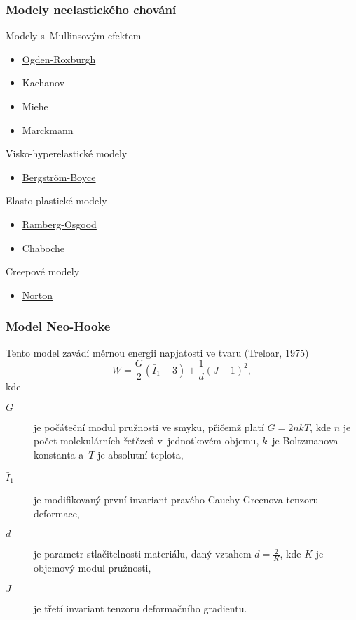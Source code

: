 \subsubsection{Modely neelastického chování}
Modely s~Mullinsovým efektem
\begin{itemize}
	\item \hyperref[sec:ogden-roxburgh]{Ogden-Roxburgh}
	\item Kachanov
	\item Miehe
	\item Marckmann
\end{itemize}

Visko-hyperelastické modely
\begin{itemize}
	\item \hyperref[sec:bergstrom-boyce]{Bergström-Boyce}
\end{itemize}

Elasto-plastické modely
\begin{itemize}
	\item \hyperref[sec:ramberg-osgood]{Ramberg-Osgood}
	\item \hyperref[sec:chaboche]{Chaboche}
\end{itemize}

Creepové modely
\begin{itemize}
	\item \hyperref[sec:norton]{Norton}
\end{itemize}

\subsubsection{Model Neo-Hooke}
Tento model zavádí měrnou energii napjatosti ve tvaru (Treloar, 1975)
\begin{equation}\label{neo_hooke}
W = \frac{G}{2} \left( \bar{I}_1 - 3 \right) + \frac{1}{d} \left( J - 1 \right)^2,
\end{equation}
kde
\begin{description}
	\item[$G$] je počáteční modul pružnosti ve smyku, přičemž platí $G = 2nkT$, kde $n$ je počet molekulárních řetězců v~jednotkovém objemu, $k$~je Boltzmanova konstanta a~$T$ je absolutní teplota,
	\item[$\bar{I}_1$] je modifikovaný první invariant pravého Cauchy-Greenova tenzoru deformace,
	\item[$d$] je parametr stlačitelnosti materiálu, daný vztahem $d = \frac{2}{K}$, kde $K$ je objemový modul pružnosti,
	\item[$J$] je třetí invariant tenzoru deformačního gradientu.
\end{description}

